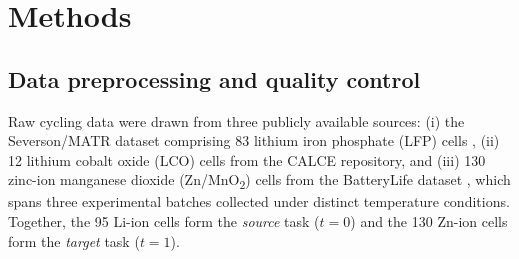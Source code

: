 
\section{Methods}

\subsection{Data preprocessing and quality control}
\label{sec:preprocessing}

Raw cycling data were drawn from three publicly available sources: (i) the
Severson/MATR dataset comprising 83 lithium iron phosphate (LFP) cells
\cite{severson2019}, (ii) 12 lithium cobalt oxide (LCO) cells from the CALCE
repository, and (iii) 130 zinc-ion manganese dioxide (Zn/MnO\textsubscript{2})
cells from the BatteryLife dataset \cite{tan2024}, which spans three
experimental batches collected under distinct temperature conditions.
Together, the 95 Li-ion cells form the \emph{source} task ($t=0$) and the
130 Zn-ion cells form the \emph{target} task ($t=1$).

